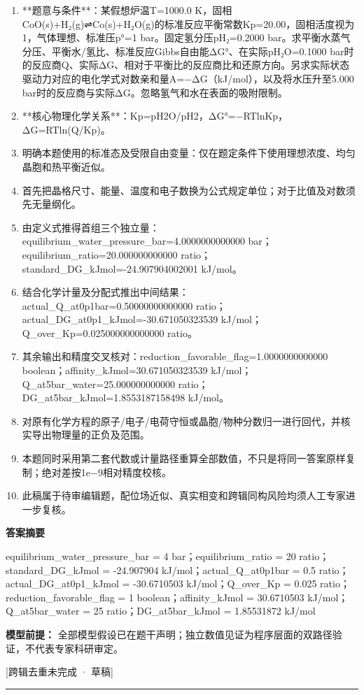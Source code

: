 \documentclass[UTF8,11pt,a4paper]{ctexart}
\begin{document}
\begin{enumerate}
\item **题意与条件**：某假想炉温T=1000.0 K，固相CoO(s)+H₂(g)⇌Co(s)+H₂O(g)的标准反应平衡常数Kp=20.00，固相活度视为1，气体理想、标准压p°=1 bar。固定氢分压pH₂=0.2000 bar。求平衡水蒸气分压、平衡水/氢比、标准反应Gibbs自由能ΔG°、在实际pH₂O=0.1000 bar时的反应商Q、实际ΔG、相对于平衡比的反应商比和还原方向。另求实际状态驱动力对应的电化学式对数亲和量A=−ΔG（kJ/mol），以及将水压升至5.000 bar时的反应商与实际ΔG。忽略氢气和水在表面的吸附限制。
\item **核心物理化学关系**：Kp=pH2O/pH2，ΔG°=−RTlnKp，ΔG=RTln(Q/Kp)。
\item 明确本题使用的标准态及受限自由变量：仅在题定条件下使用理想浓度、均匀晶胞和热平衡近似。
\item 首先把晶格尺寸、能量、温度和电子数换为公式规定单位；对于比值及对数须先无量纲化。
\item 由定义式推得首组三个独立量：equilibrium\_water\_pressure\_bar=4.0000000000000 bar；equilibrium\_ratio=20.000000000000 ratio；standard\_DG\_kJmol=-24.907904002001 kJ/mol。
\item 结合化学计量及分配式推出中间结果：actual\_Q\_at0p1bar=0.50000000000000 ratio；actual\_DG\_at0p1\_kJmol=-30.671050323539 kJ/mol；Q\_over\_Kp=0.025000000000000 ratio。
\item 其余输出和精度交叉核对：reduction\_favorable\_flag=1.0000000000000 boolean；affinity\_kJmol=30.671050323539 kJ/mol；Q\_at5bar\_water=25.000000000000 ratio；DG\_at5bar\_kJmol=1.8553187158498 kJ/mol。
\item 对原有化学方程的原子/电子/电荷守恒或晶胞/物种分数归一进行回代，并核实导出物理量的正负及范围。
\item 本题同时采用第二套代数或计量路径重算全部数值，不只是将同一答案原样复制；绝对差按1e−9相对精度校核。
\item 此稿属于待审编辑题，配位场近似、真实相变和跨辑同构风险均须人工专家进一步复核。
\end{enumerate}
\noindent\textbf{答案摘要}\par
equilibrium\_water\_pressure\_bar = 4 bar；equilibrium\_ratio = 20 ratio；standard\_DG\_kJmol = -24.907904 kJ/mol；actual\_Q\_at0p1bar = 0.5 ratio；actual\_DG\_at0p1\_kJmol = -30.6710503 kJ/mol；Q\_over\_Kp = 0.025 ratio；reduction\_favorable\_flag = 1 boolean；affinity\_kJmol = 30.6710503 kJ/mol；Q\_at5bar\_water = 25 ratio；DG\_at5bar\_kJmol = 1.85531872 kJ/mol\par
\noindent\textbf{模型前提：}
全部模型假设已在题干声明；独立数值见证为程序层面的双路径验证，不代表专家科研审定。\par
\noindent\textcolor{red!65!black}{[跨辑去重未完成 · 草稿]} \par
\medskip\hrule\medskip
{}
\end{document}

